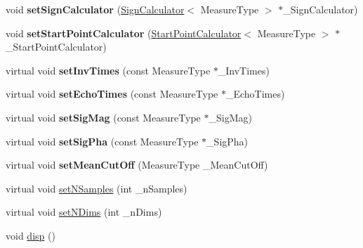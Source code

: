 \begin{DoxyCompactItemize}
\item 
\hypertarget{class_ox_1_1_calculator_t1_ae043a486f1db48e46a3e011e4a3d76b3}{void {\bfseries set\-Sign\-Calculator} (\hyperlink{class_ox_1_1_sign_calculator}{Sign\-Calculator}$<$ Measure\-Type $>$ $\ast$\-\_\-\-Sign\-Calculator)}\label{class_ox_1_1_calculator_t1_ae043a486f1db48e46a3e011e4a3d76b3}

\item 
\hypertarget{class_ox_1_1_calculator_t1_a89628a47da5bf7baddcd87f687613096}{void {\bfseries set\-Start\-Point\-Calculator} (\hyperlink{class_ox_1_1_start_point_calculator}{Start\-Point\-Calculator}$<$ Measure\-Type $>$ $\ast$\-\_\-\-Start\-Point\-Calculator)}\label{class_ox_1_1_calculator_t1_a89628a47da5bf7baddcd87f687613096}

\item 
\hypertarget{class_ox_1_1_calculator_t1_a102f4865fc2424e6f30bcbd5bf3580f3}{virtual void {\bfseries set\-Inv\-Times} (const Measure\-Type $\ast$\-\_\-\-Inv\-Times)}\label{class_ox_1_1_calculator_t1_a102f4865fc2424e6f30bcbd5bf3580f3}

\item 
\hypertarget{class_ox_1_1_calculator_t1_a31cd6081870edadc89b50ffa66e34ecb}{virtual void {\bfseries set\-Echo\-Times} (const Measure\-Type $\ast$\-\_\-\-Echo\-Times)}\label{class_ox_1_1_calculator_t1_a31cd6081870edadc89b50ffa66e34ecb}

\item 
\hypertarget{class_ox_1_1_calculator_t1_a4d0327b2105ef6b99cfacb5d37075a5a}{virtual void {\bfseries set\-Sig\-Mag} (const Measure\-Type $\ast$\-\_\-\-Sig\-Mag)}\label{class_ox_1_1_calculator_t1_a4d0327b2105ef6b99cfacb5d37075a5a}

\item 
\hypertarget{class_ox_1_1_calculator_t1_a81b313cfacfd8880e39c0e2cd87c912c}{virtual void {\bfseries set\-Sig\-Pha} (const Measure\-Type $\ast$\-\_\-\-Sig\-Pha)}\label{class_ox_1_1_calculator_t1_a81b313cfacfd8880e39c0e2cd87c912c}

\item 
\hypertarget{class_ox_1_1_calculator_t1_a08da2ecf1ea83b83854fbe09a03de839}{virtual void {\bfseries set\-Mean\-Cut\-Off} (Measure\-Type \-\_\-\-Mean\-Cut\-Off)}\label{class_ox_1_1_calculator_t1_a08da2ecf1ea83b83854fbe09a03de839}

\item 
virtual void \hyperlink{class_ox_1_1_calculator_t1_af5d84e582c3793ebe168f24245f04de1}{set\-N\-Samples} (int \-\_\-n\-Samples)
\item 
virtual void \hyperlink{class_ox_1_1_calculator_t1_abe8decf5aba8ba0de2b6ca76ec9c1386}{set\-N\-Dims} (int \-\_\-n\-Dims)
\item 
\hypertarget{class_ox_1_1_calculator_t1_ab820a5163966ce07d7be7f323ead23ae}{void \hyperlink{class_ox_1_1_calculator_t1_ab820a5163966ce07d7be7f323ead23ae}{disp} ()}\label{class_ox_1_1_calculator_t1_ab820a5163966ce07d7be7f323ead23ae}


\end{DoxyCompactItemize}
